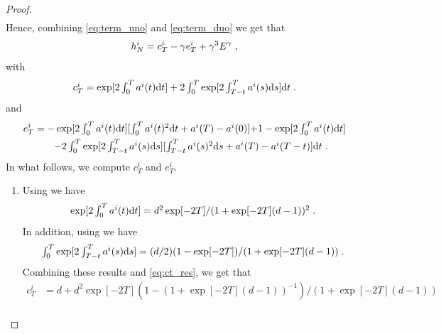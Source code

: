 \begin{proof}
\begin{align}
\end{align}
Hence, combining \eqref{eq:term_uno} and \eqref{eq:term_duo} we get that 
\begin{equation}
  h_N^i = c_T^i - \gamma e_T^i + \gamma^3 E^\gamma \; ,
\end{equation}
with
\begin{equation}
  \label{eq:ct_res}
  \textstyle{
    c_T^i  = \exp[2\int_0^T a^i(t) \mathrm{d}t] + 2\int_0^T \exp[2\int_{T-t}^T a^i(s) \mathrm{d}s] \mathrm{d}t \;. 
    }
\end{equation}
and 
\begin{align}
  \label{eq:et_res}
  e_T^i  &= \textstyle{-\exp[2\int_0^T a^i(t) \mathrm{d}t][\int_{0}^{T} a^i(t)^2 \mathrm{d}t + a^i(T) - a^i(0)]} \textstyle{+ 1 - \exp[2 \int_0^T a^i(t) \mathrm{d}t ]} \\
    & \qquad \textstyle{ - 2 \int_0^T \exp[2\int_{T-t}^T a^i(s) \mathrm{d}s][\int_{T-t}^{T} a^i(s)^2 \mathrm{d}s + a^i(T) - a^i(T-t)] \mathrm{d}t \;. 
    }
\end{align}
In what follows, we compute $c_T^i$ and $e_T^i$.
\begin{enumerate}[wide, labelwidth=!, labelindent=0pt, label=(\roman*)]
\item Using   we have
  \begin{equation}
    \textstyle{ \exp[2\int_0^T a^i(t) \mathrm{d}t] = d^2 \exp[-2T]/(1 + \exp[-2T](d-1))^2 \;. }
  \end{equation}
  In addition, using  we have
  \begin{equation}
    \textstyle{ \int_0^T \exp[2\int_{T-t}^T a^i(s) \mathrm{d}s] = (d/2) (1 - \exp[-2T])/(1 + \exp[-2T](d-1)) \;. }
  \end{equation}
  Combining these results and \eqref{eq:ct_res}, we get that
  \begin{align}
    c_T^i &= d + d^2 \exp[-2T](1 - (1 + \exp[-2T](d-1))^{-1})/(1 + \exp[-2T](d-1)) \\

\end{align}
\end{enumerate}
\end{proof}
